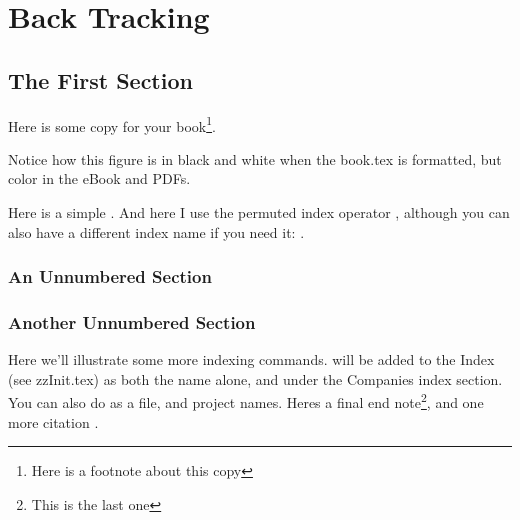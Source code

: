 \chapter{Back Tracking}
\label{abody}%

\section{The First Section}

Here is some copy for your book\footnote{Here is a footnote about this copy}.



Notice how this figure is in black and white when the book.tex is formatted, but color in the eBook and PDFs.

Here is a simple . And here I use the permuted index operator , although you can also have a different index name if you need it: .

\subsection*{An Unnumbered Section}

\lipsum[9-15]

\subsection*{Another Unnumbered Section}

\lipsum[16-22]

Here we'll illustrate some more indexing commands.  will be added to the Index (see zzInit.tex) as both the name alone,
and under the Companies index section. You can also do  as a file, and  project names. Heres a final end note\footnote{This is the last one}, and one more citation \cite{Pfister2013}.

